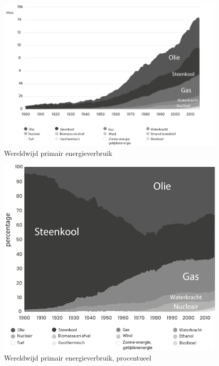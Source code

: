 \begin{figure}[!htb]
\centering
    \includegraphics[width=\textwidth]{figures/fig10-1.png}
\caption[Wereldwijd primair energieverbruik]{Wereldwijd primair energieverbruik\footnotemark}
\label{fig10}
\end{figure}

\begin{figure}[!htb]
\centering
    \includegraphics[width=\textwidth]{figures/fig11-1.png}
\caption[Wereldwijd primair energieverbruik, procentueel]{Wereldwijd primair energieverbruik, procentueel\footnotemark}
\label{fig11}
\end{figure}

